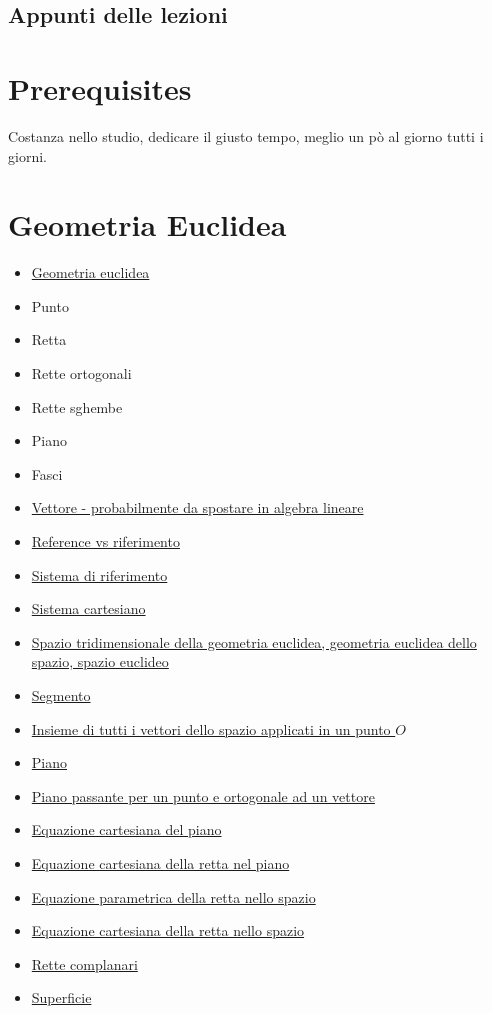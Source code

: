 \documentclass[a4paper,10pt]{article}
\begin{document}
\subsection{Appunti delle lezioni}

\section{Prerequisites}
Costanza nello studio, dedicare il giusto tempo, meglio un pò al giorno tutti i giorni.

\section{Geometria Euclidea}
  \begin{itemize}
   \item \href{./GeometriaEuclidea.html}{Geometria euclidea}	
   \item Punto
   \item Retta
   \item Rette ortogonali
   \item Rette sghembe
   \item Piano
   \item Fasci
   \item \href{./Vettore.html}{Vettore - probabilmente da spostare in algebra lineare}
   \item \href{./Reference.html}{Reference vs riferimento}
   \item \href{./SistemaRiferimento.html}{Sistema di riferimento}
   \item \href{./SistemaCartesiano.html}{Sistema cartesiano}   
   \item \href{./GeometriaEuclidea3d.html}{Spazio tridimensionale della geometria euclidea, geometria euclidea dello spazio, spazio euclideo}
   \item \href{./Segmento.html}{Segmento}
   \item \href{./InsiemeVettoriApplicati.html}{Insieme di tutti i vettori dello spazio applicati in un punto $O$}
   \item \href{./Piano.html}{Piano}
   \item \href{./PianoPassantePunto.html}{Piano passante per un punto e ortogonale ad un vettore}
   \item \href{./EquazioneCartesianaPiano.html}{Equazione cartesiana del piano}
   \item \href{./EquazioneCartesianaRettaPiano.html}{Equazione cartesiana della retta nel piano}
   \item \href{./EquazioneParametricaRettaSpazio.html}{Equazione parametrica della retta nello spazio}
   \item \href{./EquazioneCartesianaRetta.html}{Equazione cartesiana della retta nello spazio}
   \item \href{./RetteComplanari.html}{Rette complanari}
   \item \href{./Superficie.html}{Superficie}
  \end{itemize}
\end{document}
